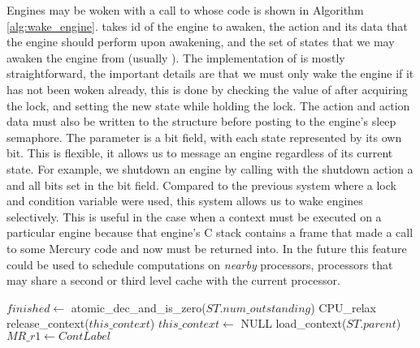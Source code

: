 Engines may be woken with a call to \wakeengine whose code is shown in
Algorithm \ref{alg:wake_engine}.
\wakeengine takes id of the engine to awaken,
the action and its data that the engine should perform upon awakening,
and the set of states that we may awaken the engine from (usually
).
The implementation of \wakeengine is mostly straightforward,
the important details are that we must only wake the engine if it has not
been woken already, this is done by checking the value of
 after acquiring the lock,
and setting the new state while holding the lock.
The action and action data must also be written to the
\enginesleepsync structure before posting to the engine's sleep
semaphore.
The parameter  is a bit field, with each state represented by
its own bit.
This is flexible, it allows us to message an engine regardless of its
current state.
For example,
we shutdown an engine by calling \wakeengine with the shutdown action a and
all bits set in the  bit field.
Compared to the previous system where a lock and condition variable were
used,
this system allows us to wake engines selectively.
This is useful in the case when a context must be executed on a particular
engine because that engine's C stack contains a frame that made a call to
some Mercury code and now must be returned into.
In the future this feature could be used to schedule computations on
\emph{nearby} processors,
processors that may share a second or third level cache with the current
processor.

\begin{algorithm}[tbp]
\begin{algorithmic}[1]
  \State $finished \gets$ atomic\_dec\_and\_is\_zero($ST.num\_outstanding$)
    \Else
        \State CPU\_relax
      \EndWhile
      \State release\_context($this\_context$)
      \State $this\_context \gets$ NULL
      \State load\_context($ST.parent$)
    \EndIf
  \Else
      \State $MR\_r1 \gets ContLabel$
    \Else
    \EndIf
  \EndIf
\EndProcedure
\end{algorithmic}
\caption{\joinandcontinue}
\label{alg:join_and_continue_ws2}
\end{algorithm}

